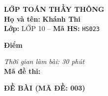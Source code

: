 \noindent
\begin{tcolorbox}[colback=white,colframe=black,arc=0mm,boxrule=0.8pt,top=4pt,bottom=4pt,left=6pt,right=6pt]
	\begin{minipage}[c]{0.44\textwidth}
		{\bfseries\large LỚP TOÁN THẦY THÔNG}\\[3pt]
		\textbf{Họ và tên:} \textbf{\large Khánh Thi}\\[3pt]
		\textbf{Lớp:} LỚP 10 \quad -- \quad \textbf{Mã HS:} \texttt{HS023}
	\end{minipage}
	\hfill
	\begin{minipage}[c]{0.22\textwidth}
		\begin{tcolorbox}[colback=white,colframe=black,arc=0mm,boxrule=0.6pt,height=1.8cm,halign=center,valign=top,top=2pt]
			{\bfseries\normalsize Điểm}
		\end{tcolorbox}
	\end{minipage}
	\hfill
	\begin{minipage}[c]{0.30\textwidth}
		\raggedleft
		\textit{Thời gian làm bài: 30 phút}\\[4pt]
		\textbf{Mã đề thi:} 
	\end{minipage}
\end{tcolorbox}
\vspace{0.25cm}

\noindent\textbf{\large ĐỀ BÀI (MÃ ĐỀ: 003)}
\vspace{0.1cm}

